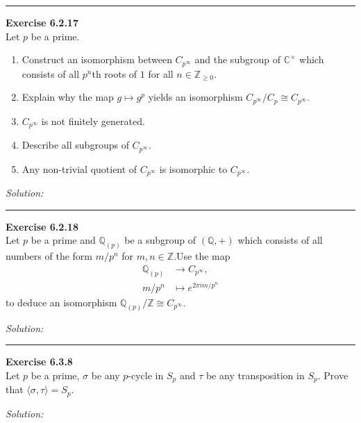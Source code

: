 \documentclass[a4paper, 12pt]{article}
\newenvironment{problem}[2][Exercise]
    { \begin{mdframed}[backgroundcolor=gray!20] \textbf{#1 #2} \\}
    {  \end{mdframed}}
\newenvironment{solution}
    {\textit{Solution:}}
    {}
\newcommand{\la}{\langle}
\newcommand{\ra}{\rangle}
\begin{document}
\noindent\rule{7in}{2.8pt}
\begin{problem}{6.2.17}
Let \(p\) be a prime.
\begin{enumerate}[(1)]
\item Construct an isomorphism between \(C_{p^\infty}\) and the subgroup of \(\mathbb{C}^\times\) which consists of all \(p^n\)th roots of \(1\) for all \(n\in \mathbb{Z}_{\geq 0}\).
\item Explain why the map \(g\mapsto g^p\) yields an isomorphism \(C_{p^\infty}/C_p\cong C_{p^\infty}\).
\item \(C_{p^\infty}\) is not finitely generated.
\item Describe all subgroups of \(C_{p^\infty}\).
\item Any non-trivial quotient of \(C_{p^\infty}\) is isomorphic to \(C_{p^\infty}\).
\end{enumerate}
\end{problem}
\begin{solution}
    
\end{solution}

\noindent\rule{7in}{2.8pt}
\begin{problem}{6.2.18}
Let \(p\) be a prime and \(\mathbb{Q}_{(p)}\) be a subgroup of \((\mathbb{Q},+)\) which consists of all numbers of the form \(m/p^n\) for \(m,n\in \mathbb{Z}\).Use the map 
\begin{align*}
    \mathbb{Q}_{(p)}&\rightarrow C_{p^\infty},\\ 
    m/p^n&\mapsto e^{2\pi im/p^n}
\end{align*} 
to deduce an isomorphism \(\mathbb{Q}_{(p)}/\mathbb{Z}\cong C_{p^\infty}\).  
\end{problem}
\begin{solution}
    
\end{solution}

\noindent\rule{7in}{2.8pt}
\begin{problem}{6.3.8}
Let \(p\) be a prime, \(\sigma\) be any \(p\)-cycle in \(S_p\) and \(\tau\) be any transposition in \(S_p\). Prove that \(\la \sigma,\tau\ra=S_p\).
\end{problem}
\begin{solution}
    
\end{solution}
\end{document}
